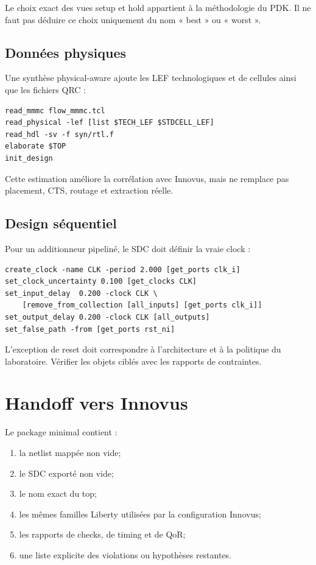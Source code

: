 \documentclass[11pt,a4paper,openany]{report}
\begin{document}
Le choix exact des vues setup et hold appartient à la méthodologie du PDK. Il
ne faut pas déduire ce choix uniquement du nom « best » ou « worst ».

\section{Données physiques}

Une synthèse physical-aware ajoute les LEF technologiques et de cellules ainsi
que les fichiers QRC :

\begin{lstlisting}[style=guidecode,language=TclGuide]
read_mmmc flow_mmmc.tcl
read_physical -lef [list $TECH_LEF $STDCELL_LEF]
read_hdl -sv -f syn/rtl.f
elaborate $TOP
init_design
\end{lstlisting}

Cette estimation améliore la corrélation avec Innovus, mais ne remplace pas
placement, CTS, routage et extraction réelle.

\section{Design séquentiel}

Pour un additionneur pipeliné, le SDC doit définir la vraie clock :

\begin{lstlisting}[style=guidecode,language=TclGuide]
create_clock -name CLK -period 2.000 [get_ports clk_i]
set_clock_uncertainty 0.100 [get_clocks CLK]
set_input_delay  0.200 -clock CLK \
    [remove_from_collection [all_inputs] [get_ports clk_i]]
set_output_delay 0.200 -clock CLK [all_outputs]
set_false_path -from [get_ports rst_ni]
\end{lstlisting}

L'exception de reset doit correspondre à l'architecture et à la politique du
laboratoire. Vérifier les objets ciblés avec les rapports de contraintes.

\chapter{Handoff vers Innovus}

Le package minimal contient :

\begin{enumerate}
  \item la netlist mappée non vide;
  \item le SDC exporté non vide;
  \item le nom exact du top;
  \item les mêmes familles Liberty utilisées par la configuration Innovus;
  \item les rapports de checks, de timing et de QoR;
  \item une liste explicite des violations ou hypothèses restantes.
\end{enumerate}
\end{document}
